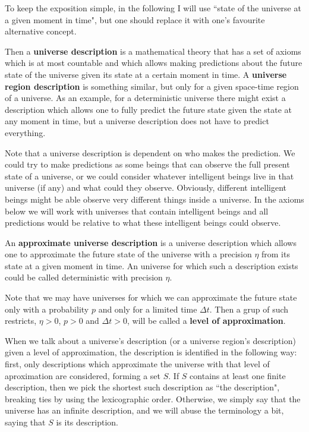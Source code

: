 \documentclass[a4paper
,draft
]{article}
\newcommand{\svn}[2][]{\todo[author=Virgil,color=red!25!white,#1]{#2}}
\newcommand{\definitie}[1]{\textbf{#1}}
\newcommand{\ghilimele}[1]{``#1"}
\begin{document}
To keep the exposition simple, in the following I will use \ghilimele{state of the universe at a given moment in time}, but one should replace it with one's favourite alternative concept.

Then a \definitie{universe description} is a mathematical theory that has a set of axioms which is at most countable and which allows making predictions about the future state of the universe given its state at a certain moment in time. A \definitie{universe region description} is something similar, but only for a given space-time region of a universe. As an example, for a deterministic universe there might exist a description which allows one to fully predict the future state given the state at any moment in time, but a universe description does not have to predict everything.

Note that a universe description is dependent on who makes the prediction. We could try to make predictions as some beings that can observe the full present state of a universe, or we could consider whatever intelligent beings live in that universe (if any) and what could they observe. Obviously, different intelligent beings might be able observe very different things inside a universe. In the axioms below we will work with universes that contain intelligent beings \svn{check that I mentioned this} and all predictions would be relative to what these intelligent beings could observe.

An \definitie{approximate universe description} is a universe description which allows one to approximate the future state of the universe with a precision $\eta$ from its state at a given moment in time. An universe for which such a description exists could be called deterministic with precision $\eta$.

Note that we may have universes for which we can approximate the future state only with a probability $p$ and only for a limited time $\Delta t$. Then a grup of such restricts, $\eta>0$, $p>0$ and $\Delta t>0$, will be called a \definitie{level of approximation}.

When we talk about a universe's description (or a universe region's description) given a level of approximation, the description is identified in the following way: first, only descriptions which approximate the universe with that level of aproximation are considered, forming a set $S$. If $S$ contains at least one finite description, then we pick the shortest such description as \ghilimele{the description}, breaking ties by using the lexicographic order. Otherwise, we simply say that the universe has an infinite description, and we will abuse the terminology a bit, saying that $S$ is its description.
\end{document}
